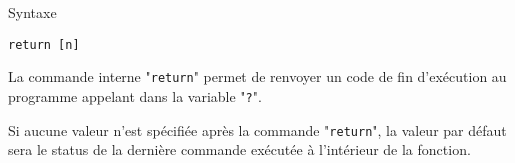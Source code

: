 \begin{definition}{Syntaxe}
\begin{verbatim}
return [n]
\end{verbatim}
\end{definition}

La commande interne "\texttt{return}" permet de renvoyer un code de fin d'ex{\'e}cution au programme 
appelant dans la variable "\texttt{?}".

Si aucune valeur n'est sp{\'e}cifi{\'e}e apr{\`e}s la commande "\texttt{return}", la valeur par d{\'e}faut sera le
status de la derni{\`e}re commande ex{\'e}cut{\'e}e {\`a} l'int{\'e}rieur de la fonction.

